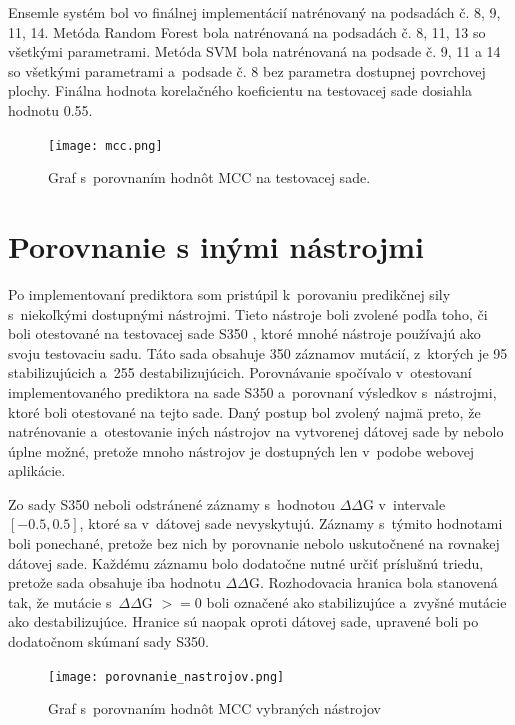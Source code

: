 Ensemle systém bol vo finálnej implementácií natrénovaný na podsadách č. 8, 9, 11, 14. Metóda Random Forest bola natrénovaná na podsadách č. 8, 11, 13 so všetkými parametrami. Metóda SVM bola natrénovaná na podsade č. 9, 11 a 14 so všetkými parametrami a~podsade č. 8 bez parametra dostupnej povrchovej plochy. Finálna hodnota korelačného koeficientu na testovacej sade dosiahla hodnotu 0.55. 

\begin{figure}[H]
	\centering
	\begin{center}
		\scalebox{0.6}
		{   
			\texttt{[image: mcc.png]}
		}
		\caption{Graf s~porovnaním hodnôt MCC na testovacej sade.}
	\end{center}
\end{figure}

\section{Porovnanie s inými nástrojmi}

Po implementovaní prediktora som pristúpil k~porovaniu predikčnej sily s~niekoľkými dostupnými nástrojmi. Tieto nástroje boli zvolené podľa toho, či boli otestované na testovacej sade S350 \cite{S350}, ktoré mnohé nástroje používajú ako svoju testovaciu sadu. Táto sada obsahuje 350 záznamov mutácií, z~ktorých je 95 stabilizujúcich a~255 destabilizujúcich. 
Porovnávanie spočívalo v~otestovaní implementovaného prediktora na sade S350 a~porovnaní výsledkov s~nástrojmi, ktoré boli otestované na tejto sade. Daný postup bol zvolený najmä preto, že natrénovanie a~otestovanie iných nástrojov na vytvorenej dátovej sade by nebolo úplne možné, pretože mnoho nástrojov je dostupných len v~podobe webovej aplikácie.

Zo sady S350 neboli odstránené záznamy s~hodnotou $\Delta\Delta$G v~intervale $\left[-0.5,0.5\right]$, ktoré sa v~dátovej sade nevyskytujú. Záznamy s~týmito hodnotami boli ponechané, pretože bez nich by porovnanie nebolo uskutočnené na rovnakej dátovej sade. Každému záznamu bolo dodatočne nutné určiť príslušnú triedu, pretože sada obsahuje iba hodnotu $\Delta\Delta$G. Rozhodovacia hranica bola stanovená tak, že mutácie s~$\Delta\Delta$G $>= 0$ boli označené ako stabilizujúce a~zvyšné mutácie ako destabilizujúce. Hranice sú naopak oproti dátovej sade, upravené boli po dodatočnom skúmaní sady S350. 


\begin{figure}[H]
	\centering
	\begin{center}
		\scalebox{0.7}
		{   
			\texttt{[image: porovnanie\_nastrojov.png]}
		}
		\caption{Graf s~porovnaním hodnôt MCC vybraných nástrojov}
		\label{porovnanie}
	\end{center}
\end{figure}

